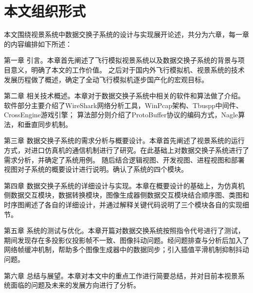 \section{本文组织形式}
本文围绕视景系统中数据交换子系统的设计与实现展开论述，共分为六章，每一章的内容编排如下所述：\par
第一章 引言。本章首先阐述了飞行模拟视景系统以及数据交换子系统的背景与项目意义，明确了本文的工作价值。
       之后对于国内外飞行模拟机、视景系统的技术发展历程做了概述，确定了全动飞行模拟机逐步国产化的宏观目标。\par
第二章 相关技术概述。本章对于数据交换子系统中相关的软件和算法做了介绍。软件部分主要介绍了WireShark网络分析工具，WinPcap架构、Tbuspp中间件、CrossEngine游戏引擎；
       算法部分则介绍了ProtoBuffer协议的编码方式，Nagle算法，和垂直同步机制。\par
第三章 数据交换子系统的需求分析与概要设计。本章首先阐述了视景系统的运行方式，对进口仿真机的通信机制进行了研究。在此基础上对数据交换子系统进行了需求分析，并确定了系统用例。
       随后结合逻辑视图、开发视图、进程视图和部署视图对子系统的概要设计进行说明。确认了系统的四个模块。\par
第四章 数据交换子系统的详细设计与实现。本章在概要设计的基础上，为仿真机侧数据交互模块，数据转换模块，图像生成器侧数据交互模块结合顺序图、类图和时序图阐述了各自的详细设计，并通过解释关键代码说明了三个模块各自的实现细节。\par
       
第五章 系统的测试与优化。本章开篇对数据交换系统按照指令代号进行了测试，期间发现存在多投影仪投影帧不一致、图像抖动问题。经问题排查与分析后加入了网络帧缓冲机制，帮助多个图像生成器中的数据同步；引入插值平滑机制抑制抖动问题。\par
第六章 总结与展望。本章对本文中的重点工作进行简要总结，并对目前本视景系统面临的问题及未来的发展方向进行了分析。